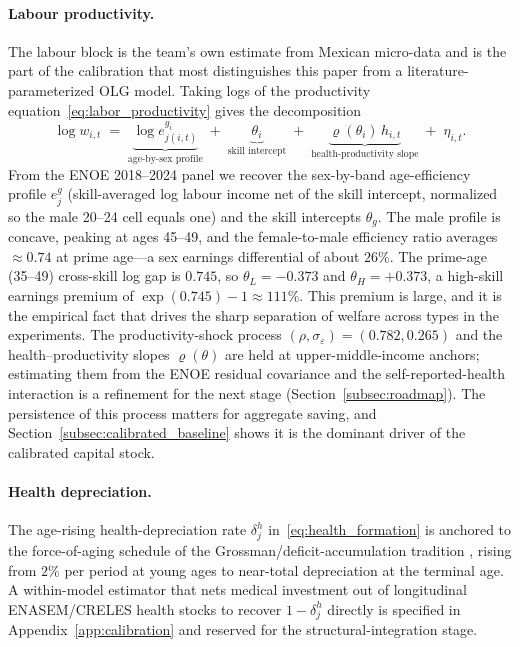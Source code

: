 \documentclass[12pt,a4paper]{article}
\begin{document}
\paragraph{Labour productivity.}
The labour block is the team's own estimate from Mexican micro-data and is the part of the calibration that most distinguishes this paper from a literature-parameterized OLG model. Taking logs of the productivity equation~\eqref{eq:labor_productivity} gives the decomposition
\begin{equation}
\label{eq:logwage_decomp}
\log w_{i,t} \;=\; \underbrace{\log e^{g_i}_{j(i,t)}}_{\text{age-by-sex profile}} \;+\; \underbrace{\theta_{i}}_{\text{skill intercept}} \;+\; \underbrace{\varrho(\theta_i)\, h_{i,t}}_{\text{health-productivity slope}} \;+\; \eta_{i,t}.
\end{equation}
From the ENOE 2018--2024 panel we recover the sex-by-band age-efficiency profile $e^g_j$ (skill-averaged log labour income net of the skill intercept, normalized so the male 20--24 cell equals one) and the skill intercepts $\theta_g$. The male profile is concave, peaking at ages 45--49, and the female-to-male efficiency ratio averages $\approx 0.74$ at prime age---a sex earnings differential of about $26\%$. The prime-age (35--49) cross-skill log gap is $0.745$, so $\theta_L=-0.373$ and $\theta_H=+0.373$, a high-skill earnings premium of $\exp(0.745)-1\approx 111\%$. This premium is large, and it is the empirical fact that drives the sharp separation of welfare across types in the experiments. The productivity-shock process $(\rho,\sigma_\varepsilon)=(0.782,0.265)$ and the health--productivity slopes $\varrho(\theta)$ are held at upper-middle-income anchors; estimating them from the ENOE residual covariance and the self-reported-health interaction is a refinement for the next stage (Section~\ref{subsec:roadmap}). The persistence of this process matters for aggregate saving, and Section~\ref{subsec:calibrated_baseline} shows it is the dominant driver of the calibrated capital stock.

\paragraph{Health depreciation.}
The age-rising health-depreciation rate $\delta^h_j$ in~\eqref{eq:health_formation} is anchored to the force-of-aging schedule of the Grossman/deficit-accumulation tradition \citep{DalgaardStrulik2014}, rising from $2\%$ per period at young ages to near-total depreciation at the terminal age. A within-model estimator that nets medical investment out of longitudinal ENASEM/CRELES health stocks to recover $1-\delta^h_j$ directly is specified in Appendix~\ref{app:calibration} and reserved for the structural-integration stage.
\end{document}

